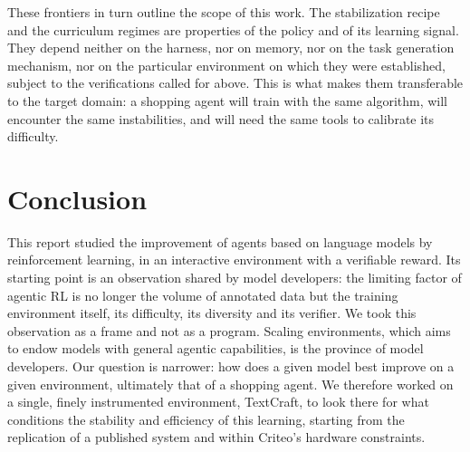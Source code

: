 \documentclass[11pt,a4paper]{article}
\begin{document}
These frontiers in turn outline the scope of this work. The stabilization recipe and the curriculum regimes are properties of the policy and of its learning signal. They depend neither on the harness, nor on memory, nor on the task generation mechanism, nor on the particular environment on which they were established, subject to the verifications called for above. This is what makes them transferable to the target domain: a shopping agent will train with the same algorithm, will encounter the same instabilities, and will need the same tools to calibrate its difficulty.






\clearpage
\section{Conclusion}

This report studied the improvement of agents based on language models by reinforcement learning, in an interactive environment with a verifiable reward. Its starting point is an observation shared by model developers: the limiting factor of agentic RL is no longer the volume of annotated data but the training environment itself, its difficulty, its diversity and its verifier. We took this observation as a frame and not as a program. Scaling environments, which aims to endow models with general agentic capabilities, is the province of model developers. Our question is narrower: how does a given model best improve on a given environment, ultimately that of a shopping agent. We therefore worked on a single, finely instrumented environment, TextCraft, to look there for what conditions the stability and efficiency of this learning, starting from the replication of a published system and within Criteo's hardware constraints.
\end{document}
